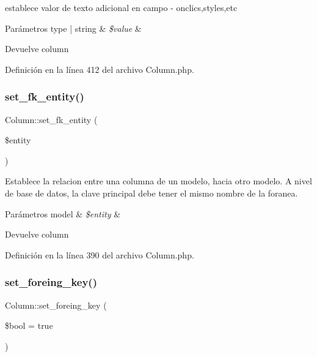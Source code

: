 establece valor de texto adicional en campo -\/ onclics,styles,etc


\begin{DoxyParams}[1]{Parámetros}
type | string & {\em \$value} & \\
\hline
\end{DoxyParams}
\begin{DoxyReturn}{Devuelve}
column 
\end{DoxyReturn}


Definición en la línea 412 del archivo Column.\+php.

\mbox{\label{class_column_ac98ea0f2cf873e1169d470b6b8aed87e}} 
\subsubsection{\texorpdfstring{set\_fk\_entity()}{set\_fk\_entity()}}
{\footnotesize\ttfamily Column\+::set\+\_\+fk\+\_\+entity (\begin{DoxyParamCaption}\item[{}]{\$entity }\end{DoxyParamCaption})}

Establece la relacion entre una columna de un modelo, hacia otro modelo. A nivel de base de datos, la clave principal debe tener el mismo nombre de la foranea.


\begin{DoxyParams}[1]{Parámetros}
model & {\em \$entity} & \\
\hline
\end{DoxyParams}
\begin{DoxyReturn}{Devuelve}
column 
\end{DoxyReturn}


Definición en la línea 390 del archivo Column.\+php.

\mbox{\label{class_column_a5ec7cacb0cd684328df7e04a9bf1e891}} 
\subsubsection{\texorpdfstring{set\_foreing\_key()}{set\_foreing\_key()}}
{\footnotesize\ttfamily Column\+::set\+\_\+foreing\+\_\+key (\begin{DoxyParamCaption}\item[{}]{\$bool = {\ttfamily true} }\end{DoxyParamCaption})}

